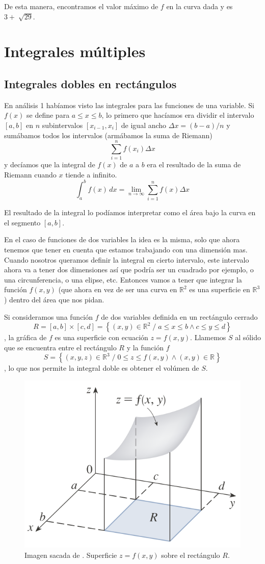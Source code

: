 \documentclass[12pt]{article}
\begin{document}
De esta manera, encontramos el valor máximo de $ f $ en la curva dada y es $ 3+\sqrt[]{29} $.

\section{Integrales múltiples}
\subsection{Integrales dobles en rectángulos}
En análisis 1 habíamos visto las integrales para las funciones de una variable. Si $ f(x) $ se define para $ a\leq x\leq b $, lo primero que hacíamos era dividir el intervalo $ \left[a,b\right] $ en $ n $ subintervalos $ \left[x_{i-1},x_{i}\right] $ de igual ancho $ \Delta x=(b-a)/n $ y sumábamos todos los intervalos (armábamos la suma de Riemann)
\[
  \sum_{i=1}^{n} f(x_{i})\Delta x
\]
y decíamos que la integral de $ f(x) $ de $ a $ a $ b $ era el resultado de la suma de Riemann cuando $ x $ tiende a infinito.
\[
  \int_{a}^{b} f(x) \,dx = \lim_{n \to \infty}\sum_{i=1}^{n} f(x)\Delta x
\]

El resultado de la integral lo podíamos interpretar como el área bajo la curva en el segmento $ \left[a,b\right] $.

En el caso de funciones de dos variables la idea es la misma, solo que ahora tenemos que tener en cuenta que estamos trabajando con una dimensión mas. Cuando nosotros queramos definir la integral en cierto intervalo, este intervalo ahora va a tener dos dimensiones así que podría ser un cuadrado por ejemplo, o una circunferencia, o una elipse, etc. Entonces vamos a tener que integrar la función $ f(x,y) $ (que ahora en vez de ser una curva en $ \mathbb{R}^{2} $ es una superficie en $ \mathbb{R}^{3} $) dentro del área que nos pidan.

Si consideramos una función $ f $ de dos variables definida en un rectángulo cerrado 
\[
  R = \left[a,b\right]\times \left[c,d\right] = \left\{(x,y) \in \mathbb{R}^{2} \;/\; a\leq x\leq b  \land c\leq y\leq d\right\}
\]
, la gráfica de $ f $ es una superficie con ecuación $ z=f(x,y) $. Llamemos $ S $ al sólido que se encuentra entre el rectángulo $ R $ y la función $ f $
\[
  S=\left\{(x,y,z) \in \mathbb{R}^{3} \;/\; 0\leq z\leq f(x,y) \land (x,y) \in \mathbb{R}^{}\right\}
\]
, lo que nos permite la integral doble es obtener el volúmen de $ S $.

\begin{figure}[H]
  \centering
  \includegraphics[width=0.5\linewidth]{imagenes/vol-integrado-1.png}
  \caption{Imagen sacada de \parencite{stewart2}. Superficie $ z=f(x,y) $ sobre el rectángulo $ R $.}
  \label{fig:integrales-1}
\end{figure}
\end{document}
